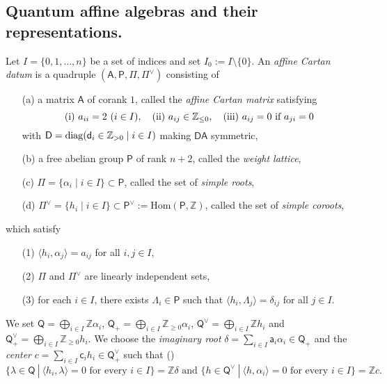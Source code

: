\documentclass[11pt, leqno]{amsart}
\theoremstyle{definition}
\numberwithin{equation}{section}
\begin{document}
\subsection{Quantum affine algebras and their representations.} Let $I = \{0,1, \ldots, n \}$ be a set of indices and set $I_0 {\mathbin{:=}} I \setminus \{ 0 \}$. An {\it affine Cartan datum} is
a quadruple $({\mathsf{A}},{\mathsf{P}},\Pi,\Pi^\vee)$ consisting of
\begin{enumerate}
\item[({\rm a})] a matrix ${\mathsf{A}}$ of corank $1$, called the {\it affine Cartan matrix} satisfying
$$ ({\rm i}) \ a_{ii}=2 \ (i \in I), \quad ({\rm ii}) \ a_{ij} \in {\mathbb Z}_{\le 0}, \quad  ({\rm iii}) \ a_{ij}=0 \text{ if } a_{ji}=0$$
with $\mathsf{D}= {\rm diag}(\mathsf{d}_i \in {\mathbb Z}_{>0}  \mid i \in I)$ making $\mathsf{D}{\mathsf{A}}$ symmetric,
\item[({\rm b})] a free abelian group ${\mathsf{P}}$ of rank $n+2$, called the {\it weight lattice},
\item[({\rm c})] $\Pi = \{ \alpha_i \mid i\in I \} \subset {\mathsf{P}}$, called the set of {\it simple roots},
\item[({\rm d})] $\Pi^{\vee} = \{ h_i \mid i\in I\} \subset {\mathsf{P}}^{\vee} := {\mathrm{Hom}}( {\mathsf{P}}, {\mathbb Z} )$, called the set of {\it simple coroots},
\end{enumerate}
which satisfy
\begin{itemize}
\item[(1)] $\langle h_i, \alpha_j \rangle  = a_{ij}$ for all $i,j\in I$,
\item[(2)] $\Pi$ and $\Pi^{\vee}$ are linearly independent sets,
\item[(3)] for each $i \in I$, there exists $\Lambda_i \in {\mathsf{P}}$ such that $\langle h_i, \Lambda_j \rangle =\delta_{ij}$ for all $j \in I$.
\end{itemize}
We set ${\mathsf{Q}} = \bigoplus_{i \in I} {\mathbb Z} \alpha_i$, ${\mathsf{Q}}_+ = \bigoplus_{i \in I} {\mathbb Z}_{\ge 0} \alpha_i$, ${\mathsf{Q}}^\vee = \bigoplus_{i \in I} {\mathbb Z} h_i$ and
${\mathsf{Q}}^\vee_+ = \bigoplus_{i \in I} {\mathbb Z}_{\ge 0} h_i$.
We choose the {\it imaginary root} $\delta=\sum_{i \in I}\mathsf{a}_i \alpha_i \in {\mathsf{Q}}_+$ and the {\it center} $c=\sum_{i \in I} \mathsf{c}_ih_i \in {\mathsf{Q}}^\vee_+$
such that (\cite[Chapter 4]{Kac})
$$ \{ \lambda \in {\mathsf{Q}} \ | \ \langle h_i,\lambda \rangle =0 \text{ for every } i \in I \} ={\mathbb Z} \delta  \text{ and }
\{ h \in {\mathsf{Q}}^\vee \ | \ \langle h,\alpha_i \rangle =0 \text{ for every } i \in I \} ={\mathbb Z} c.$$
\end{document}
